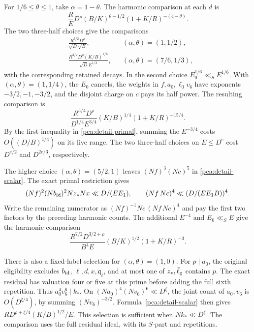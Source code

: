 For \(1/6\le\theta\le1\), take \(\alpha=1-\theta\).
The harmonic comparison at each \(d\) is
\begin{equation}\label{pca:detail-harmonic}
 \frac R E D^\rho (B/K)^{\theta-1/2}
                   (1+K/R)^{-(4-\theta)}.
\end{equation}
The two three-half choices give the comparisons
\[
 \begin{aligned}
 &\frac{R^{3/2}D^\rho}{\sqrt D\sqrt E},
       &&(\alpha,\theta)=(1,1/2),\\
 &\frac{R^{3/2}D^\rho(K/B)^{1/6}}{\sqrt D E^{1/3}},
       &&(\alpha,\theta)=(7/6,1/3),
 \end{aligned}
\]
with the corresponding retained decays. In the second choice
\(E_0^{1/6}\ll_S E^{1/6}\). With \((\alpha,\theta)=(1,1/4)\),
the \(E_0\) cancels, the weights in \(f,a_0,\ell_0v_6\) have
exponents \(-3/2,-1,-3/2\), and the disjoint charge on \(c\)
pays its half power. The resulting comparison is
\begin{equation}\label{pca:detail-quarter}
 \frac{R^{5/4}D^\rho}{D^{1/4}E^{3/4}}
             (K/B)^{1/4}(1+K/R)^{-15/4}.
\end{equation}
By the first inequality in \eqref{pca:detail-primal}, summing
the \(E^{-3/4}\) costs \(O((D/B)^{1/4})\) on its live range.
The two three-half choices on \(E\le D^e\) cost
\(D^{e/2}\) and \(D^{2e/3}\), respectively.

The higher choice \((\alpha,\theta)=(5/2,1)\) leaves
\((Nf)^3(Nc)^5\) in \eqref{pca:detail-scalar}.
The exact primal restriction gives
\[
 (Nf)^2(Nb_{\rm id})^2Nz_*Nx\ll D/(E E_1),
 \qquad (Nf\,Nc)^4\ll (D/(E E_1B))^4 .
\]
Write the remaining numerator as
\((Nf)^{-1}Nc\,(Nf\,Nc)^4\) and pay the first two factors by
the preceding harmonic counts. The additional \(E^{-4}\) and
\(E_0\ll_S E\) give the harmonic comparison
\begin{equation}\label{pca:detail-high}
 \frac{R^{7/2}D^{3/2+\rho}}{B^4 E}
                 (B/K)^{1/2}(1+K/R)^{-3}.
\end{equation}

There is also a fixed-label selection for \((\alpha,\theta)=(1,0)\).
For \(p\mid a_0\), the original eligibility excludes \(b_{\rm id}\),
\(\ell,d,x,\mathfrak q_\ell\), and at most one of \(z_*,\bar\ell_{\rm g}\)
contains \(p\). The exact residual has valuation four or five at this
prime before adding the full sixth repetition. Thus
\(a_0^4v_6^6\mid k_*\). On \((Na_0)^4(Nv_6)^6\ll D^\xi\),
the joint count of \(a_0,v_6\) is \(O(D^{\xi/4})\), by summing
\((Nv_6)^{-3/2}\). Formula~\eqref{pca:detail-scalar} then gives
\(R D^{\rho+\xi/4}(K/B)^{1/2}/E\). This selection is sufficient
when \(Nk_*\ll D^\xi\). The comparison uses the full residual
ideal, with its \(S\)-part and repetitions.


